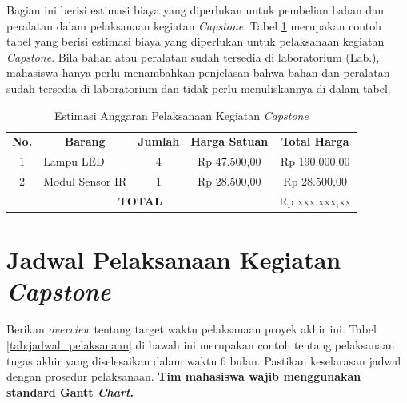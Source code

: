     Bagian ini berisi estimasi biaya yang diperlukan untuk pembelian bahan dan peralatan dalam pelaksanaan kegiatan \textit{Capstone}. Tabel \ref{tab:estimasi_anggaran} merupakan contoh tabel yang berisi estimasi biaya yang diperlukan untuk pelaksanaan kegiatan \textit{Capstone}. Bila bahan atau peralatan sudah tersedia di laboratorium (Lab.), mahasiswa hanya perlu menambahkan penjelasan bahwa bahan dan peralatan sudah tersedia di laboratorium dan tidak perlu menuliskannya di dalam tabel.

        \begin{longtable}{|clcc|c|}
            \caption{Estimasi Anggaran Pelaksanaan Kegiatan \textit{Capstone}}
            \label{tab:estimasi_anggaran}
            \vspace{-0.75em}\\
            \hline
\multicolumn{1}{|c|}{\textbf{No.}} & \multicolumn{1}{c|}{\textbf{Barang}} & \multicolumn{1}{c|}{\textbf{Jumlah}} & \textbf{Harga Satuan} & \textbf{Total Harga} \\ 
            \hline
\multicolumn{1}{|c|}{1}            & \multicolumn{1}{l|}{Lampu LED}       & \multicolumn{1}{c|}{4}               & Rp 47.500,00          & Rp 190.000,00        \\ 
            \hline
\multicolumn{1}{|c|}{2}            & \multicolumn{1}{l|}{Modul Sensor IR} & \multicolumn{1}{c|}{1}               & Rp 28.500,00          & Rp 28.500,00         \\ 
            \hline
\multicolumn{4}{|c|}{\textbf{TOTAL}}                                                                                                     & Rp xxx.xxx,xx        \\ 
            \hline
        \end{longtable}
        
\section{Jadwal Pelaksanaan Kegiatan \textit{Capstone}}

    Berikan \textit{overview} tentang target waktu pelaksanaan proyek akhir ini. Tabel \ref{tab:jadwal_pelaksanaan} di bawah ini merupakan contoh tentang pelaksanaan tugas akhir yang diselesaikan dalam waktu 6 bulan. Pastikan keselarasan jadwal dengan prosedur pelaksanaan. \textbf{Tim mahasiswa wajib menggunakan standard Gantt \textit{Chart}.}
    

